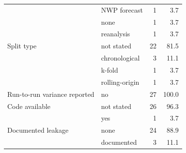 \begin{table}[t]
\begin{tabular}{llrr}
     & NWP forecast & 1 & 3.7 \\
     & none & 1 & 3.7 \\
     & reanalysis & 1 & 3.7 \\
    \addlinespace
    Split type & not stated & 22 & 81.5 \\
     & chronological & 3 & 11.1 \\
     & k-fold & 1 & 3.7 \\
     & rolling-origin & 1 & 3.7 \\
    \addlinespace
    Run-to-run variance reported & no & 27 & 100.0 \\
    \addlinespace
    Code available & not stated & 26 & 96.3 \\
     & yes & 1 & 3.7 \\
    \addlinespace
    Documented leakage & none & 24 & 88.9 \\
     & documented & 3 & 11.1 \\
    \bottomrule
  \end{tabular}
\end{table}
